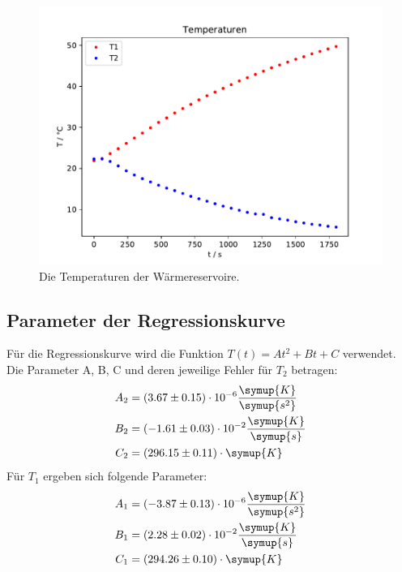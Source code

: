 \begin{figure}[H]
  \centering
  \includegraphics{build/Temperaturen.pdf}
  \caption{Die Temperaturen der Wärmereservoire.}
  \label{fig:Temperaturen}
\end{figure}

\subsection{Parameter der Regressionskurve}
Für die Regressionskurve wird die Funktion $T(t) = At^2 + Bt + C$ verwendet. Die
Parameter A, B, C und deren jeweilige Fehler für $T_2$ betragen:
\begin{align*}
  A_2 &= (3.67 \pm 0.15) \cdot 10^{-6} \frac{\symup{K}}{\symup{s^2}} \\
  B_2 &= (-1.61 \pm 0.03) \cdot 10^{-2} \frac{\symup{K}}{\symup{s}}  \\
  C_2 &= (296.15 \pm 0.11) \cdot  \symup{K}
\end{align*}
Für $T_1$ ergeben sich folgende Parameter:
\begin{align*}
  A_1 &= (-3.87 \pm 0.13) \cdot 10^{-6} \frac{\symup{K}}{\symup{s^2}} \\
  B_1 &= (2.28 \pm 0.02)  \cdot 10^{-2} \frac{\symup{K}}{\symup{s}}  \\
  C_1 &= (294.26 \pm 0.10 )\cdot \symup{K}
\end{align*}
